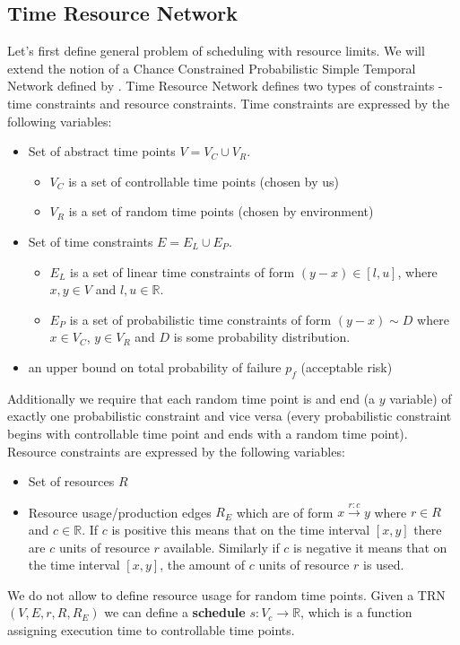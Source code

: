 \documentclass{article}
\begin{document}
\begin{multicols}{2}
\subsection{Time Resource Network}
Let's first define general problem of scheduling with resource limits. We will extend the notion of a Chance Constrained Probabilistic Simple Temporal Network defined by \cite{Fang2014}. Time Resource Network defines two types of constraints - time constraints and resource constraints. Time constraints are expressed by the following variables:
\begin{itemize}
\item Set of abstract time points $V = V_C \cup V_R $.
\begin{itemize}
\item $V_C$ is a set of controllable time points (chosen by us)
\item $V_R$ is a set of random time points (chosen by environment)
\end{itemize}
\item Set of time constraints $E = E_L \cup E_P $.
\begin{itemize}
\item $E_L$ is a set of linear time constraints of form $(y-x) \in [l,u]$, where $x,y \in V$ and $l,u \in \mathbb{R}$.
\item $E_P$ is a set of probabilistic time constraints of form $ (y-x) \sim D$ where $x \in V_C$, $y \in V_R$ and $D$ is some probability distribution.
\end{itemize}
\item an upper bound on total probability of failure $p_f$ (acceptable risk)
\end{itemize}
Additionally we require that each random time point is and end (a $y$ variable) of exactly one probabilistic constraint and vice versa (every probabilistic constraint begins with controllable time point and ends with a random time point).\\
Resource constraints are expressed by the following variables:
\begin{itemize}
\item Set of resources $R$
\item Resource usage/production edges $R_E$ which are of form $x \xrightarrow{r:c} y$ where $r\in R$ and $c \in \mathbb{R}$. If $c$ is positive this means that on the time interval $[x,y]$ there are $c$ units of resource $r$ available. Similarly if $c$ is negative it means that on the time interval $[x,y]$, the amount of $c$ units of resource $r$ is used.
\end{itemize}
We do not allow to define resource usage for random time points.
Given a TRN $(V,E,r,R,R_E)$ we can define a \textbf{schedule} $s: V_c \rightarrow \mathbb{R}$, which is a function assigning execution time to controllable time points.

\end{multicols}
\end{document}
